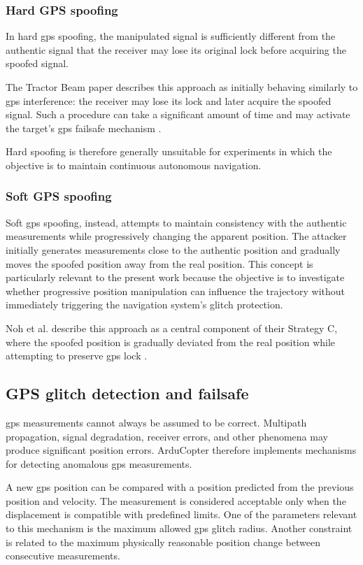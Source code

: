 \subsubsection{Hard GPS spoofing}
In hard \gls{gps} spoofing, the manipulated signal is sufficiently different from the authentic signal that the receiver may lose its original lock before acquiring the spoofed signal.

The Tractor Beam paper describes this approach as initially behaving similarly to \gls{gps} interference: the receiver may lose its lock and later acquire the spoofed signal. Such a procedure can take a significant amount of time and may activate the target's \gls{gps} failsafe mechanism \cite{noh2019tractorbeam}.

Hard spoofing is therefore generally unsuitable for experiments in which the objective is to maintain continuous autonomous navigation. 

\subsubsection{Soft GPS spoofing} 
Soft \gls{gps} spoofing, instead, attempts to maintain consistency with the authentic measurements while progressively changing the apparent position.
The attacker initially generates measurements close to the authentic position and gradually moves the spoofed position away from the real position.
This concept is particularly relevant to the present work because the objective is to investigate whether progressive position manipulation can influence the trajectory without immediately triggering the navigation system's glitch protection.

Noh et al. describe this approach as a central component of their Strategy C, where the spoofed position is gradually deviated from the real position while attempting to preserve \gls{gps} lock \cite{noh2019tractorbeam}. 

\subsection{GPS glitch detection and failsafe}
\gls{gps} measurements cannot always be assumed to be correct.
Multipath propagation, signal degradation, receiver errors, and other phenomena may produce significant position errors.
ArduCopter therefore implements mechanisms for detecting anomalous \gls{gps} measurements.

A new \gls{gps} position can be compared with a position predicted from the previous position and velocity.
The measurement is considered acceptable only when the displacement is compatible with predefined limits.
One of the parameters relevant to this mechanism is the maximum allowed \gls{gps} glitch radius.
Another constraint is related to the maximum physically reasonable position change between consecutive measurements.


